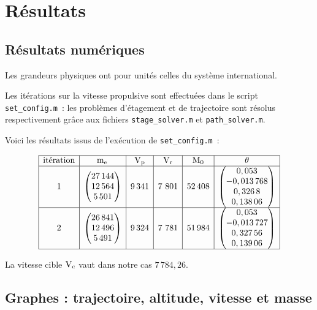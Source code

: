 \section{Résultats}

\subsection{Résultats numériques}

Les grandeurs physiques ont pour unités celles du système international.

Les itérations sur la vitesse propulsive sont effectuées dans le script \lstinline+set_config.m+~: les problèmes d'étagement et de trajectoire sont résolus respectivement grâce aux fichiers \lstinline+stage_solver.m+ et \lstinline+path_solver.m+.

Voici les résultats issus de l'exécution de \lstinline+set_config.m+~:

\[\begin{array}{|c|c|c|c|c|c|}\hline
\text{itération} & \masspropel{} & \propellingvlct & \realvlct & \mathrm{M}_0 & \theta\\ \hline
1 & \begin{pmatrix}27\,144\\ 12\,564\\ 5\,501\end{pmatrix} & 9\,341 & 7\ 801 & 52\,408 & %
\begin{pmatrix}0,053\\ -0,013\,768\\ 0,326\,8\\ 0,138\,06\end{pmatrix}\\\hline
2 & \begin{pmatrix}26\,841\\ 12\,496\\ 5\,491\end{pmatrix} & 9\,324 & 7\ 781 & 51\,984 & %
\begin{pmatrix}0,053\\ -0,013\,727\\ 0,327\,56\\ 0,139\,06\end{pmatrix}\\\hline
\end{array}\]

La vitesse cible $\mathrm{V}_{\mathrm{c}}$ vaut dans notre cas $7\,784,26$.

\subsection{Graphes : trajectoire, altitude, vitesse et masse}

